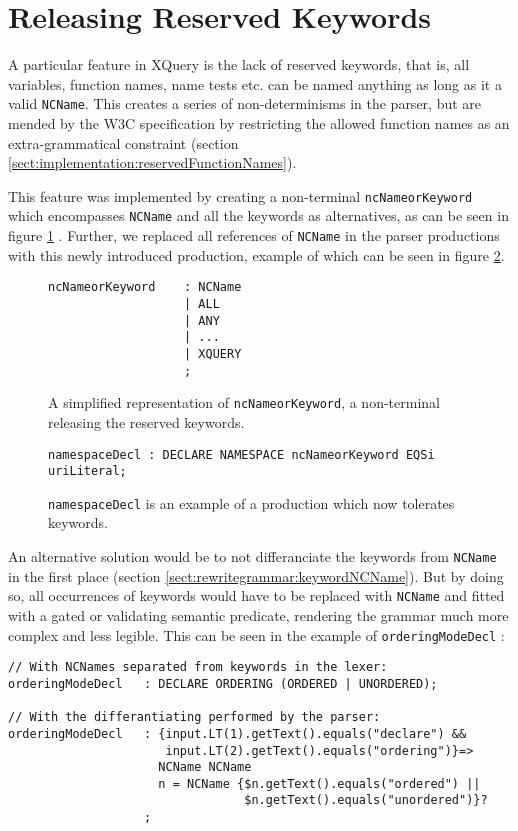 \section{Releasing Reserved Keywords}
\label{sect:impl:reserved_keywords}
A particular feature in XQuery is the lack of reserved keywords, that is, all variables, function names, name tests etc. can be named anything as long as it a valid \verb!NCName!. This creates a series of non-determinisms in the parser, but are mended by the W3C specification by restricting the allowed function names as an extra-grammatical constraint (section \ref{sect:implementation:reservedFunctionNames}).

This feature was implemented by creating a non-terminal \verb!ncNameorKeyword! which encompasses \verb!NCName! and all the keywords as alternatives, as can be seen in figure \ref{fig:ncnNameorKeyword} . Further, we replaced all references of \verb!NCName! in the parser productions with this newly introduced production, example of which can be seen in figure \ref{fig:namespaceDeclKeywordfree}.

\begin{figure}[h!]
\begin{Verbatim}
ncNameorKeyword    : NCName
                   | ALL
                   | ANY
                   | ...
                   | XQUERY
                   ;
\end{Verbatim}
\label{fig:ncnNameorKeyword}
\caption[\texttt{ncNameorKeyword} releases the reserved keywords]{A simplified representation of \texttt{ncNameorKeyword}, a non-terminal releasing the reserved keywords.}
\end{figure}

\begin{figure}[h!]
\begin{Verbatim}
namespaceDecl : DECLARE NAMESPACE ncNameorKeyword EQSi uriLiteral;
\end{Verbatim}
\label{fig:namespaceDeclKeywordfree}
\caption[Example of a production permitting keywords]{\texttt{namespaceDecl} is an example of a production which now tolerates keywords.}
\end{figure}

An alternative solution would be to not differanciate the keywords from \verb!NCName! in the first place (section \ref{sect:rewritegrammar:keywordNCName}). But by doing so, all occurrences of keywords would have to be replaced with \verb!NCName! and fitted with a gated or validating semantic predicate, rendering the grammar much more complex and less legible. This can be seen in the example of \verb!orderingModeDecl! :
\begin{Verbatim}
// With NCNames separated from keywords in the lexer:
orderingModeDecl   : DECLARE ORDERING (ORDERED | UNORDERED);

// With the differantiating performed by the parser:
orderingModeDecl   : {input.LT(1).getText().equals("declare") && 
                      input.LT(2).getText().equals("ordering")}=>
                     NCName NCName
                     n = NCName {$n.getText().equals("ordered") || 
                                 $n.getText().equals("unordered")}?
                   ;
\end{Verbatim}

